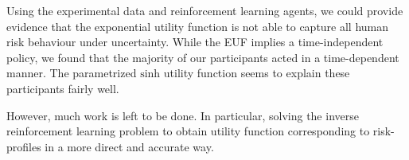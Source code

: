 Using the experimental data and reinforcement learning agents, we could provide evidence that the exponential utility function is not able to capture all human risk behaviour under uncertainty. While the EUF implies a time-independent policy, we found that the majority of our participants acted in a time-dependent manner. The parametrized $\text{sinh}$ utility function seems to explain these participants fairly well.

However, much work is left to be done. In particular, solving the inverse reinforcement learning problem to obtain utility function corresponding to risk-profiles in a more direct and accurate way.